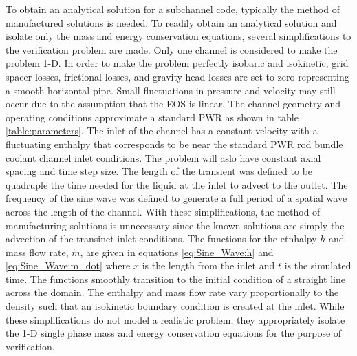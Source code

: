 \documentclass{mc2015}
\begin{document}

To obtain an analytical solution for a subchannel code, typically the method
of manufactured solutions \cite{Knupp2000} is needed. To readily obtain an
analytical solution and isolate only the mass and energy conservation equations,
several simplifications to the verification problem are made. Only one channel
is considered to make the problem 1-D. In order to make the problem perfectly
isobaric and isokinetic, grid spacer losses, frictional losses, and gravity head
losses are set to zero representing a smooth horizontal pipe. Small fluctuations
in pressure and velocity may still occur due to the assumption that the EOS is
linear. The channel geometry and operating conditions approximate a standard PWR
as shown in table \ref{table:parameters}. The inlet of the channel has a
constant velocity with a fluctuating enthalpy that corresponds to be near the
standard PWR rod bundle coolant channel inlet conditions. The problem will aslo
have constant axial spacing and time step size. The length of the
transient was defined to be quadruple the time needed for the liquid at the
inlet to advect to the outlet. The frequency of the sine wave was defined to
generate a full period of a spatial wave across the length of the channel. With
these simplifications, the method of manufacturing solutions is unnecessary
since the known solutions are simply the advection of the transinet inlet
conditions. The functions for the etnhalpy $h$ and mass flow rate, $\dot{m}$,
are given in equations \ref{eq:Sine_Wave:h} and \ref{eq:Sine_Wave:m_dot} where
$x$ is the length from the inlet and $t$ is the simulated time. The functions
smoothly transition to the initial condition of a straight line across the
domain. The enthalpy and mass flow rate vary proportionally to the density such
that an isokinetic boundary condition is created at the inlet. While these
simplifications do not model a realistic problem, they appropriately isolate the
1-D single phase mass and energy conservation equations for the purpose of
verification. 
\end{document}
